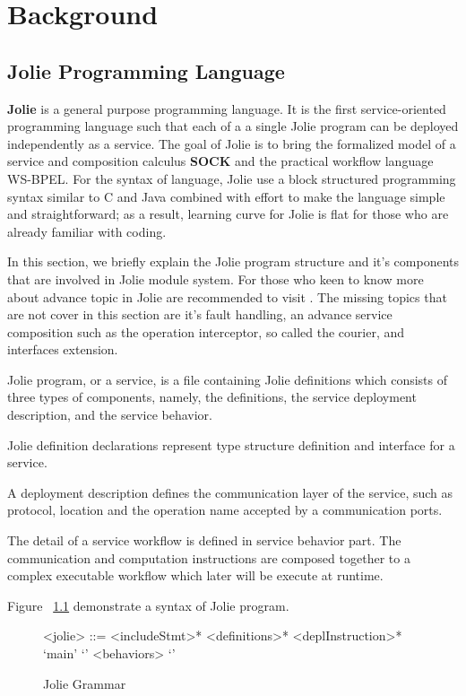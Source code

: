 \chapter{Background}

\section{Jolie Programming Language}

\textbf{Jolie}\cite{JOLIE} is a general purpose programming language.
It is the first service-oriented programming language such that each of a a single Jolie program can be deployed independently as a service.
The goal of Jolie is to bring the formalized model of a service and composition calculus \textbf{SOCK} \cite{10.1007/11948148-27} and the practical workflow language WS-BPEL\cite{OASIS}.
For the syntax of language, Jolie use a block structured programming syntax similar to C and Java combined with effort to make the language simple and straightforward; as a result, learning curve for Jolie is flat for those who are already familiar with coding.

In this section, we briefly explain the Jolie program structure and it's components that are involved in Jolie module system. For those who keen to know more about advance topic in Jolie are recommended to visit \cite{joliedoc, JOLIE}. The missing topics that are not cover in this section are it's fault handling, an advance service composition such as the operation interceptor, so called the courier, and interfaces extension.

Jolie program, or a service, is a file containing Jolie definitions which consists of three types of components, namely, the definitions, the service deployment description, and the service behavior.

Jolie definition declarations represent type structure definition and interface for a service.

A deployment description defines the communication layer of the service, such as protocol, location and the operation name accepted by a communication ports.

The detail of a service workflow is defined in service behavior part. The communication and computation instructions are composed together to a complex executable workflow which later will be execute at runtime. 

Figure ~\ref{fig:JolieGrammar} demonstrate a syntax of Jolie program.

\begin{figure}[h]
    \begin{framed}
        \begin{grammar}
            <jolie> ::= <includeStmt>* <definitions>* <deplInstruction>*  `main' `{' <behaviors> `}'
        \end{grammar}
    \end{framed}
    \caption{Jolie Grammar}
    \label{fig:JolieGrammar}
\end{figure}

